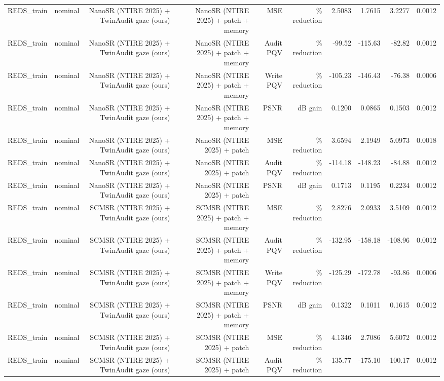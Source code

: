 \begin{table}[t]
\begin{tabular}{llrrrrrrrr}
REDS\_train & nominal & NanoSR (NTIRE 2025) + TwinAudit gaze (ours) & NanoSR (NTIRE 2025) + patch + memory & MSE & \% reduction & 2.5083 & 1.7615 & 3.2277 & 0.0012 \\
REDS\_train & nominal & NanoSR (NTIRE 2025) + TwinAudit gaze (ours) & NanoSR (NTIRE 2025) + patch + memory & Audit PQV & \% reduction & -99.52 & -115.63 & -82.82 & 0.0012 \\
REDS\_train & nominal & NanoSR (NTIRE 2025) + TwinAudit gaze (ours) & NanoSR (NTIRE 2025) + patch + memory & Write PQV & \% reduction & -105.23 & -146.43 & -76.38 & 0.0006 \\
REDS\_train & nominal & NanoSR (NTIRE 2025) + TwinAudit gaze (ours) & NanoSR (NTIRE 2025) + patch + memory & PSNR & dB gain & 0.1200 & 0.0865 & 0.1503 & 0.0012 \\
REDS\_train & nominal & NanoSR (NTIRE 2025) + TwinAudit gaze (ours) & NanoSR (NTIRE 2025) + patch & MSE & \% reduction & 3.6594 & 2.1949 & 5.0973 & 0.0018 \\
REDS\_train & nominal & NanoSR (NTIRE 2025) + TwinAudit gaze (ours) & NanoSR (NTIRE 2025) + patch & Audit PQV & \% reduction & -114.18 & -148.23 & -84.88 & 0.0012 \\
REDS\_train & nominal & NanoSR (NTIRE 2025) + TwinAudit gaze (ours) & NanoSR (NTIRE 2025) + patch & PSNR & dB gain & 0.1713 & 0.1195 & 0.2234 & 0.0012 \\
REDS\_train & nominal & SCMSR (NTIRE 2025) + TwinAudit gaze (ours) & SCMSR (NTIRE 2025) + patch + memory & MSE & \% reduction & 2.8276 & 2.0933 & 3.5109 & 0.0012 \\
REDS\_train & nominal & SCMSR (NTIRE 2025) + TwinAudit gaze (ours) & SCMSR (NTIRE 2025) + patch + memory & Audit PQV & \% reduction & -132.95 & -158.18 & -108.96 & 0.0012 \\
REDS\_train & nominal & SCMSR (NTIRE 2025) + TwinAudit gaze (ours) & SCMSR (NTIRE 2025) + patch + memory & Write PQV & \% reduction & -125.29 & -172.78 & -93.86 & 0.0006 \\
REDS\_train & nominal & SCMSR (NTIRE 2025) + TwinAudit gaze (ours) & SCMSR (NTIRE 2025) + patch + memory & PSNR & dB gain & 0.1322 & 0.1011 & 0.1615 & 0.0012 \\
REDS\_train & nominal & SCMSR (NTIRE 2025) + TwinAudit gaze (ours) & SCMSR (NTIRE 2025) + patch & MSE & \% reduction & 4.1346 & 2.7086 & 5.6072 & 0.0012 \\
REDS\_train & nominal & SCMSR (NTIRE 2025) + TwinAudit gaze (ours) & SCMSR (NTIRE 2025) + patch & Audit PQV & \% reduction & -135.77 & -175.10 & -100.17 & 0.0012 \\

\end{tabular}
\end{table}
